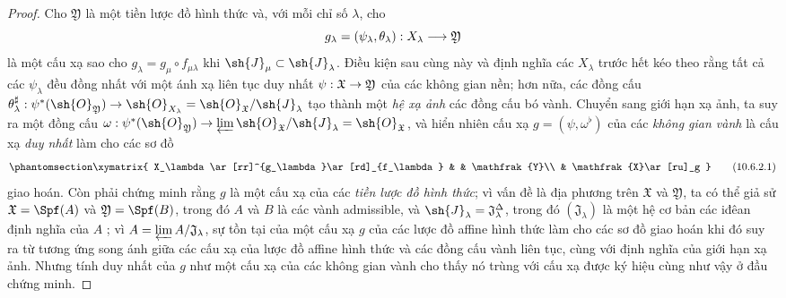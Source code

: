 \documentclass[oneside]{amsart}
\makeatletter
\newcommand{\ega@arrow}[2]{\mathchoice{#1}{#2}{#2}{#2}}
\renewcommand{\to}{\ega@arrow{\longrightarrow}{\rightarrow}}
\let\EGAOriginalLabel\label
\renewcommand{\label}[1]{\phantomsection\EGAOriginalLabel{#1}}
\makeatother
\begin{document}
\begin{proof}
Cho $\mathfrak{Y}$ là một tiền lược đồ hình thức và, với mỗi chỉ số $\lambda$, cho
\[
  g_\lambda=(\psi_\lambda,\theta_\lambda):X_\lambda\to\mathfrak{Y}
\]
là một cấu xạ sao cho $g_\lambda=g_\mu\circ f_{\mu\lambda}$ khi $\sh{J}_\mu\subset\sh{J}_\lambda$.
Điều kiện sau cùng này và định nghĩa các $X_\lambda$ trước hết kéo theo rằng tất cả các $\psi_\lambda$ đều đồng nhất với một ánh xạ liên tục duy nhất $\psi:\mathfrak{X}\to\mathfrak{Y}$ của các không gian nền; hơn nữa, các đồng cấu $\theta_\lambda^\sharp:\psi^*(\sh{O}_\mathfrak{Y})\to\sh{O}_{X_\lambda}=\sh{O}_\mathfrak{X}/\sh{J}_\lambda$ tạo thành một \emph{hệ xạ ảnh} các đồng cấu bó vành.
Chuyển sang giới hạn xạ ảnh, ta suy ra một đồng cấu $\omega:\psi^*(\sh{O}_\mathfrak{Y})\to\varprojlim\sh{O}_\mathfrak{X}/\sh{J}_\lambda=\sh{O}_\mathfrak{X}$, và hiển nhiên cấu xạ $g=(\psi,\omega^\flat)$ của các \emph{không gian vành} là cấu xạ \emph{duy nhất} làm cho các sơ đồ
\[
\label{I.10.6.2.1}
  \xymatrix{
    X_\lambda\ar[rr]^{g_\lambda}\ar[rd]_{f_\lambda} & &
    \mathfrak{Y}\\
    & \mathfrak{X}\ar[ru]_g
  }
  \tag{10.6.2.1}
\]
giao hoán.
Còn phải chứng minh rằng $g$ là một cấu xạ của các \emph{tiền lược đồ hình thức}; vì vấn đề là địa phương trên $\mathfrak{X}$ và $\mathfrak{Y}$, ta có thể giả sử $\mathfrak{X}=\Spf(A)$ và $\mathfrak{Y}=\Spf(B)$, trong đó $A$ và $B$ là các vành admissible, và $\sh{J}_\lambda=\mathfrak{J}_\lambda^\Delta$, trong đó $(\mathfrak{J}_\lambda)$ là một hệ cơ bản các iđêan định nghĩa của $A$ ; vì $A=\varprojlim A/\mathfrak{J}_\lambda$, sự tồn tại của một cấu xạ $g$ của các lược đồ affine hình thức làm cho các sơ đồ  giao hoán khi đó suy ra từ tương ứng song ánh  giữa các cấu xạ của lược đồ affine hình thức và các đồng cấu vành liên tục, cùng với định nghĩa của giới hạn xạ ảnh.
Nhưng tính duy nhất của $g$ như một cấu xạ của các không gian vành cho thấy nó trùng với cấu xạ được ký hiệu cùng như vậy ở đầu chứng minh.
\end{proof}
\end{document}
